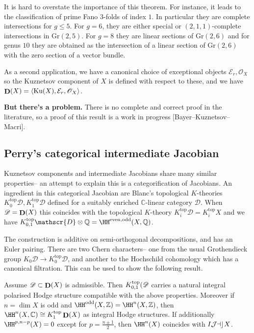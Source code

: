It is hard to overstate the importance of this theorem. For instance, it leads
to the classification of prime Fano 3-folds of index \(1\). In particular they
are complete intersections for \(g\leq 5\). For \(g=6\), they are either
special or \((2,1,1)\)-complete intersections in \(\text{Gr}(2,5)\). For
\(g=8\) they are linear sections of \(\text{Gr}(2,6)\) and for genus
\(10\) they are obtained as the intersection of a linear section of
\(\text{Gr}(2,6)\) with the zero section of a vector bundle.

As a second application, we have a canonical choice of exceptional objects
\(\mathcal{E}_r, \mathscr{O}_X\) so the Kuznetsov component of \(X\) is defined
with respect to these, and we have \(\mathop{\mathbf{D}}(X)=\langle\text{Ku}(X), \mathcal{E}_r,
\mathscr{O}_X \rangle\).

\textbf{But there's a problem.} There is no complete and correct proof in the
literature, so a proof of this result is a work in progress
[Bayer--Kuznetsov--Macri].

\subsection{Perry's categorical intermediate Jacobian} Kuznetsov components and
intermediate Jacobians share many similar properties-- an attempt to explain
this is a categorification of Jacobians. An ingredient in this
categorical Jacobian are Blanc's topological \(K\)-theories \(K_0^\text{top}\mathscr{D},
K_1^\text{top}\mathscr{D}\) defined for a suitably enriched
\(\mathbb{C}\)-linear category \(\mathscr{D}\). When
\(\mathscr{D}=\mathop{\mathbf{D}}(X)\) this coincides with the topological \(K\)-theory
\(K_i^\text{top}\mathscr{D}=K_i^\text{top}X\) and we have
\(K^\text{top}_{0,1}\mathscr{D}\otimes
\mathbb{Q}=\HH^{\text{even},\text{odd}}(X,\mathbb{Q})\).

The construction is additive on semi-orthogonal decompositions, and has an Euler
pairing. There are two Chern characters-- one from the usual Grothendieck group
\(K_0\mathscr{D}\to K_0^\text{top}\mathscr{D}\), and another to the Hochschild
cohomology which has a canonical filtration. This can be used to show the
following result.

\begin{theorem}[(Perry)]
    Assume \(\mathscr{D}\subset \mathop{\mathbf{D}}(X)\) is admissible. Then
    \(K^\textnormal{top}_{0,1}(\mathscr{D}\) carries a natural integral polarised
    Hodge structure compatible with the above properties. Moreover if
    \(n=\dim X\) is odd and
    \(\HH^\textnormal{odd}(X,\mathbb{Z})=\HH^n(X,\mathbb{Z})\), then
    \(\HH^n(X,\mathbb{C})\cong K_1^\textnormal{top}\deri(X)\) as integral Hodge
    structures. If additionally \(\HH^{p,n-p}(X)=0\) except for
    \(p=\frac{n\pm 1}{2}\), then \(\HH^n(X)\) coincides with
    \(\mathop{I\mathcal{J\kern -0.5pt a\kern -0.5pt c\kern -1pt}} X\).
\end{theorem}

